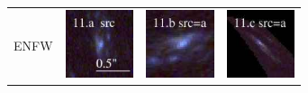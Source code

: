 \documentclass[useAMS,usenatbib]{mn2e}
\begin{document}
\begin{table}
\begin{tabular}{cccc}
    \multicolumn{1}{m{1cm}}{{\Large ENFW}}
    & \multicolumn{1}{m{1.7cm}}{\includegraphics[height=2.00cm,clip]{figs/enfw_img/rgb.src_11_a.ps}}
    & \multicolumn{1}{m{1.7cm}}{\includegraphics[height=2.00cm,clip]{figs/enfw_img/rgb.pre_11_b_a_tri.ps}}
    & \multicolumn{1}{m{1.7cm}}{\includegraphics[height=2.00cm,clip]{figs/enfw_img/rgb.pre_11_c_a_tri.ps}} \\
  \end{tabular}

\end{table}
\end{document}
